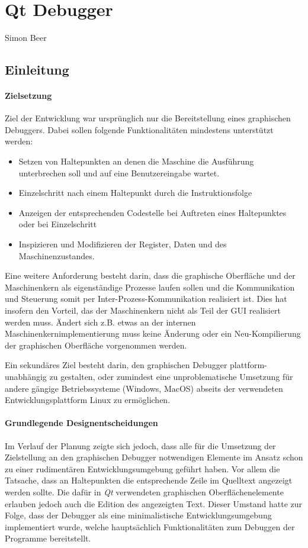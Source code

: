 \section{Qt Debugger}
\begin{flushright}
Simon Beer
\end{flushright}

\subsection{Einleitung}

\paragraph{Zielsetzung}
Ziel der Entwicklung war ursprünglich nur die Bereitstellung eines graphischen Debuggers. Dabei sollen folgende Funktionalitäten mindestens unterstützt werden:

\begin{itemize}
	\item Setzen von Haltepunkten an denen die Maschine die Ausführung unterbrechen soll und auf eine Benutzereingabe wartet.
	\item Einzelschritt nach einem Haltepunkt durch die Instruktionsfolge
	\item Anzeigen der entsprechenden Codestelle bei Auftreten eines Haltepunktes oder bei Einzelschritt
	\item Inspizieren und Modifizieren der Register, Daten und des Maschinenzustandes.
\end{itemize}

Eine weitere Anforderung besteht darin, dass die graphische Oberfläche und der Maschinenkern als eigenständige Prozesse laufen sollen und die Kommunikation und Steuerung somit per Inter-Prozess-Kommunikation realisiert ist. Dies hat insofern den Vorteil, das der Maschinenkern nicht als Teil der GUI realisiert werden muss. Ändert sich z.B. etwas an der internen Maschinenkernimplementierung muss keine Änderung oder ein Neu-Kompilierung der graphischen Oberfläche vorgenommen werden.

Ein sekundäres Ziel besteht darin, den graphischen Debugger plattform-unabhängig zu gestalten, oder zumindest eine unproblematische Umsetzung für andere gängige Betriebssysteme (Windows, MacOS) abseits der verwendeten Entwicklungsplattform Linux zu ermöglichen.

\paragraph{Grundlegende Designentscheidungen}
Im Verlauf der Planung zeigte sich jedoch, dass alle für die Umsetzung der Zielstellung an den graphischen Debugger notwendigen Elemente im Ansatz schon zu einer rudimentären Entwicklungsumgebung geführt haben. Vor allem die Tatsache, dass an Haltepunkten die entsprechende Zeile im Quelltext angezeigt werden sollte. Die dafür in \emph{Qt} verwendeten graphischen Oberflächenelemente erlauben jedoch auch die Edition des angezeigten Text. Dieser Umstand hatte zur Folge, dass der Debugger als eine minimalistische Entwicklungsumgebung  implementiert wurde, welche hauptsächlich Funktionalitäten zum Debuggen der Programme bereitstellt. 

